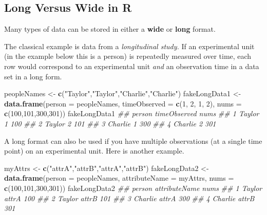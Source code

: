 \documentclass[12pt,krantz2]{krantz}
\makeatletter
\newenvironment{Shaded}{\begin{snugshade}}{\end{snugshade}}
\newcommand{\CommentTok}[1]{\textcolor[rgb]{0.37,0.37,0.37}{\textit{#1}}}
\newcommand{\DataTypeTok}[1]{\textcolor[rgb]{0.27,0.27,0.27}{#1}}
\newcommand{\DecValTok}[1]{\textcolor[rgb]{0.06,0.06,0.06}{#1}}
\newcommand{\KeywordTok}[1]{\textcolor[rgb]{0.27,0.27,0.27}{\textbf{#1}}}
\newcommand{\NormalTok}[1]{#1}
\newcommand{\StringTok}[1]{\textcolor[rgb]{0.5,0.5,0.5}{#1}}
\newenvironment{kframe}{%
\medskip{}
\setlength{\fboxsep}{.8em}
 \def\at@end@of@kframe{}%
 \ifinner\ifhmode%
  \def\at@end@of@kframe{\end{minipage}}%
  \begin{minipage}{\columnwidth}%
 \fi\fi%
 \def\FrameCommand##1{\hskip\@totalleftmargin \hskip-\fboxsep
 \colorbox{shadecolor}{##1}\hskip-\fboxsep
     \hskip-\linewidth \hskip-\@totalleftmargin \hskip\columnwidth}%
 \MakeFramed {\advance\hsize-\width
   \@totalleftmargin\z@ \linewidth\hsize
   \@setminipage}}%
 {\par\unskip\endMakeFramed%
 \at@end@of@kframe}
\renewenvironment{Shaded}{\begin{kframe}}{\end{kframe}}
\makeatother
\begin{document}
\hypertarget{long-versus-wide-in-r}{%
\subsection{Long Versus Wide in R}\label{long-versus-wide-in-r}}

Many types of data can be stored in either a \textbf{wide} or \textbf{long} format.

The classical example is data from a \emph{longitudinal study.} If an experimental unit (in the example below this is a person) is repeatedly measured over time, each row would correspond to an experimental unit \emph{and} an observation time in a data set in a long form.

\begin{Shaded}
\begin{Highlighting}[]
\NormalTok{peopleNames <-}\StringTok{ }\KeywordTok{c}\NormalTok{(}\StringTok{"Taylor"}\NormalTok{,}\StringTok{"Taylor"}\NormalTok{,}\StringTok{"Charlie"}\NormalTok{,}\StringTok{"Charlie"}\NormalTok{)}
\NormalTok{fakeLongData1 <-}\StringTok{ }\KeywordTok{data.frame}\NormalTok{(}\DataTypeTok{person =}\NormalTok{ peopleNames, }
                             \DataTypeTok{timeObserved =} \KeywordTok{c}\NormalTok{(}\DecValTok{1}\NormalTok{, }\DecValTok{2}\NormalTok{, }\DecValTok{1}\NormalTok{, }\DecValTok{2}\NormalTok{),}
                             \DataTypeTok{nums =} \KeywordTok{c}\NormalTok{(}\DecValTok{100}\NormalTok{,}\DecValTok{101}\NormalTok{,}\DecValTok{300}\NormalTok{,}\DecValTok{301}\NormalTok{))}
\NormalTok{fakeLongData1}
\CommentTok{##    person timeObserved nums}
\CommentTok{## 1  Taylor            1  100}
\CommentTok{## 2  Taylor            2  101}
\CommentTok{## 3 Charlie            1  300}
\CommentTok{## 4 Charlie            2  301}
\end{Highlighting}
\end{Shaded}

A long format can also be used if you have multiple observations (at a single time point) on an experimental unit. Here is another example.

\begin{Shaded}
\begin{Highlighting}[]
\NormalTok{myAttrs <-}\StringTok{ }\KeywordTok{c}\NormalTok{(}\StringTok{"attrA"}\NormalTok{,}\StringTok{"attrB"}\NormalTok{,}\StringTok{"attrA"}\NormalTok{,}\StringTok{"attrB"}\NormalTok{)}
\NormalTok{fakeLongData2 <-}\StringTok{ }\KeywordTok{data.frame}\NormalTok{(}\DataTypeTok{person =}\NormalTok{ peopleNames, }
                             \DataTypeTok{attributeName =}\NormalTok{ myAttrs,}
                             \DataTypeTok{nums =} \KeywordTok{c}\NormalTok{(}\DecValTok{100}\NormalTok{,}\DecValTok{101}\NormalTok{,}\DecValTok{300}\NormalTok{,}\DecValTok{301}\NormalTok{))}
\NormalTok{fakeLongData2}
\CommentTok{##    person attributeName nums}
\CommentTok{## 1  Taylor         attrA  100}
\CommentTok{## 2  Taylor         attrB  101}
\CommentTok{## 3 Charlie         attrA  300}
\CommentTok{## 4 Charlie         attrB  301}
\end{Highlighting}
\end{Shaded}
\end{document}
